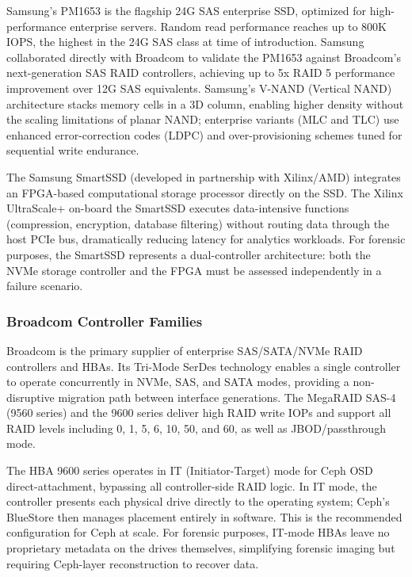\documentclass[11pt,letterpaper]{article}
\begin{document}
Samsung's PM1653 is the flagship 24G SAS enterprise SSD, optimized for high-performance enterprise servers. Random read performance reaches up to 800K IOPS, the highest in the 24G SAS class at time of introduction. Samsung collaborated directly with Broadcom to validate the PM1653 against Broadcom's next-generation SAS RAID controllers, achieving up to 5x RAID 5 performance improvement over 12G SAS equivalents. Samsung's V-NAND (Vertical NAND) architecture stacks memory cells in a 3D column, enabling higher density without the scaling limitations of planar NAND; enterprise variants (MLC and TLC) use enhanced error-correction codes (LDPC) and over-provisioning schemes tuned for sequential write endurance.

The Samsung SmartSSD (developed in partnership with Xilinx/AMD) integrates an FPGA-based computational storage processor directly on the SSD. The Xilinx UltraScale+ on-board the SmartSSD executes data-intensive functions (compression, encryption, database filtering) without routing data through the host PCIe bus, dramatically reducing latency for analytics workloads. For forensic purposes, the SmartSSD represents a dual-controller architecture: both the NVMe storage controller and the FPGA must be assessed independently in a failure scenario.

\subsubsection{Broadcom Controller Families}

Broadcom is the primary supplier of enterprise SAS/SATA/NVMe RAID controllers and HBAs. Its Tri-Mode SerDes technology enables a single controller to operate concurrently in NVMe, SAS, and SATA modes, providing a non-disruptive migration path between interface generations. The MegaRAID SAS-4 (9560 series) and the 9600 series deliver high RAID write IOPs and support all RAID levels including 0, 1, 5, 6, 10, 50, and 60, as well as JBOD/passthrough mode.

The HBA 9600 series operates in IT (Initiator-Target) mode for Ceph OSD direct-attachment, bypassing all controller-side RAID logic. In IT mode, the controller presents each physical drive directly to the operating system; Ceph's BlueStore then manages placement entirely in software. This is the recommended configuration for Ceph at scale. For forensic purposes, IT-mode HBAs leave no proprietary metadata on the drives themselves, simplifying forensic imaging but requiring Ceph-layer reconstruction to recover data.
\end{document}
